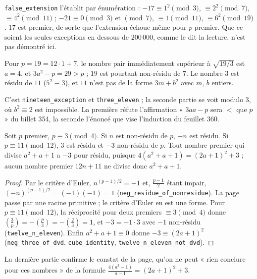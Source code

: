 \texttt{false\_extension} l'établit par énumération : $-17 \equiv 1^2 \pmod 3$, $\equiv 2^2 \pmod 7$, $\equiv 4^2 \pmod{11}$ ; $-21 \equiv 0 \pmod 3$ et $\pmod 7$, $\equiv 1 \pmod{11}$, $\equiv 6^2 \pmod{19}$. $17$ est premier, de sorte que l'extension échoue même pour $p$ premier. Que ce soient les seules exceptions en dessous de $200\,000$, comme le dit la lecture, n'est pas démontré ici.

\begin{contrexemple}
Pour $p = 19 = 12 \cdot 1 + 7$, le nombre pair immédiatement supérieur à $\sqrt{19/3}$ est $a = 4$, et $3a^2 - p = 29 > p$ ; $19$ est pourtant non-résidu de $7$. Le nombre $3$ est résidu de $11$ ($5^2 \equiv 3$), et $11$ n'est pas de la forme $3m + b^2$ avec $m$, $b$ entiers.
\end{contrexemple}

C'est \texttt{nineteen\_exception} et \texttt{three\_eleven} ; la seconde partie se voit modulo $3$, où $b^2 \equiv 2$ est impossible. La première réfute l'affirmation « $3aa - p$ sera $<$ que $p$ » du billet 354, la seconde l'énoncé que vise l'induction du feuillet 360.

\begin{enonce}
Soit $p$ premier, $p \equiv 3 \pmod 4$. Si $n$ est non-résidu de $p$, $-n$ est résidu. Si $p \equiv 11 \pmod{12}$, $3$ est résidu et $-3$ non-résidu de $p$. Tout nombre premier qui divise $a^2 + a + 1$ a $-3$ pour résidu, puisque $4(a^2+a+1) = (2a+1)^2 + 3$ ; aucun nombre premier $12n+11$ ne divise donc $a^2+a+1$.
\end{enonce}

\begin{proof}
Par le critère d'Euler, $n^{(p-1)/2} = -1$ et, $\frac{p-1}{2}$ étant impair, $(-n)^{(p-1)/2} = (-1)(-1) = 1$ (\texttt{neg\_residue\_of\_nonresidue}). La page passe par une racine primitive ; le critère d'Euler en est une forme. Pour $p \equiv 11 \pmod{12}$, la réciprocité pour deux premiers $\equiv 3 \pmod 4$ donne $\left(\frac{3}{p}\right) = -\left(\frac{p}{3}\right) = -\left(\frac{2}{3}\right) = 1$, et $-3 = -1 \cdot 3$ avec $-1$ non-résidu (\texttt{twelve\_n\_eleven}). Enfin $a^2 + a + 1 \equiv 0$ donne $-3 \equiv (2a+1)^2$ (\texttt{neg\_three\_of\_dvd}, \texttt{cube\_identity}, \texttt{twelve\_n\_eleven\_not\_dvd}).
\end{proof}

La dernière partie confirme le constat de la page, qu'on ne peut « rien conclure pour ces nombres » de la formule $\frac{4(a^3-1)}{a-1} = (2a+1)^2 + 3$.

